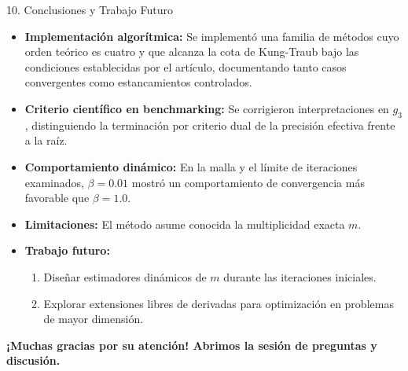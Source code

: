 \documentclass[aspectratio=169,10pt]{beamer}
\begin{document}
\begin{frame}{10. Conclusiones y Trabajo Futuro}
  \begin{itemize}
    \item \textbf{Implementación algorítmica:} Se implementó una familia de métodos cuyo orden teórico es cuatro y que alcanza la cota de Kung-Traub bajo las condiciones establecidas por el artículo, documentando tanto casos convergentes como estancamientos controlados.
    \item \textbf{Criterio científico en benchmarking:} Se corrigieron interpretaciones en $g_3$, distinguiendo la terminación por criterio dual de la precisión efectiva frente a la raíz.
    \item \textbf{Comportamiento dinámico:} En la malla y el límite de iteraciones examinados, $\beta=0.01$ mostró un comportamiento de convergencia más favorable que $\beta=1.0$.
    \item \textbf{Limitaciones:} El método asume conocida la multiplicidad exacta $m$.
    \item \textbf{Trabajo futuro:}
    \begin{enumerate}
      \item Diseñar estimadores dinámicos de $m$ durante las iteraciones iniciales.
      \item Explorar extensiones libres de derivadas para optimización en problemas de mayor dimensión.
    \end{enumerate}
  \end{itemize}
  \vspace{0.2cm}
  \centering
  \textbf{¡Muchas gracias por su atención! Abrimos la sesión de preguntas y discusión.}
\end{frame}
\end{document}
